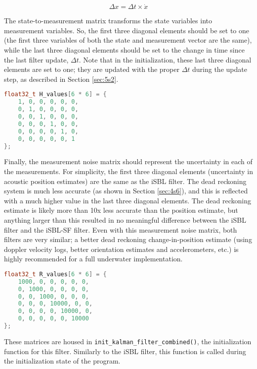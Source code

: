 \documentclass[11pt]{ucthesisCP}
\begin{document}
\begin{equation} \label{eq:isblsf2}
	\Delta x = \Delta t \times \dot{x}
\end{equation}

The state-to-measurement matrix transforms the state variables into measurement variables. So, the first three diagonal elements should be set to one (the first three variables of both the state and measurement vector are the same), while the last three diagonal elements should be set to the change in time since the last filter update, \(\Delta t\). Note that in the initialization, these last three diagonal elements are set to one; they are updated with the proper \(\Delta t\) during the update step, as described in Section \ref{sec:5s2}.

\begin{lstlisting}[language=C++]
float32_t H_values[6 * 6] = {
	1, 0, 0, 0, 0, 0,
	0, 1, 0, 0, 0, 0,
	0, 0, 1, 0, 0, 0,
	0, 0, 0, 1, 0, 0,
	0, 0, 0, 0, 1, 0,
	0, 0, 0, 0, 0, 1
};
\end{lstlisting}

Finally, the measurement noise matrix should represent the uncertainty in each of the measurements. For simplicity, the first three diagonal elements (uncertainty in acoustic position estimates) are the same as the iSBL filter. The dead reckoning system is much less accurate (as shown in Section \ref{sec:4s6}), and this is reflected with a much higher value in the last three diagonal elements. The dead reckoning estimate is likely more than 10x less accurate than the position estimate, but anything larger than this resulted in no meaningful difference between the iSBL filter and the iSBL-SF filter. Even with this measurement noise matrix, both filters are very similar; a better dead reckoning change-in-position estimate (using doppler velocity logs, better orientation estimates and accelerometers, etc.) is highly recommended for a full underwater implementation.

\begin{lstlisting}[language=C++]
float32_t R_values[6 * 6] = {
	1000, 0, 0, 0, 0, 0,
	0, 1000, 0, 0, 0, 0,
	0, 0, 1000, 0, 0, 0,
	0, 0, 0, 10000, 0, 0,
	0, 0, 0, 0, 10000, 0,
	0, 0, 0, 0, 0, 10000
};
\end{lstlisting}

These matrices are housed in \verb|init_kalman_filter_combined()|, the initialization function for this filter. Similarly to the iSBL filter, this function is called during the initialization state of the program.
\end{document}

